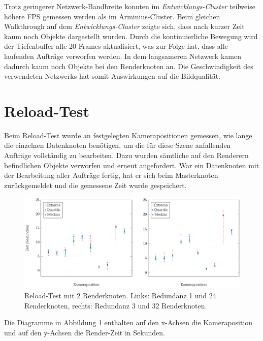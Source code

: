 Trotz geringerer Netzwerk-Bandbreite konnten im \textit{Entwicklungs-Cluster} teilweise höhere FPS gemessen werden als im Arminius-Cluster. Beim gleichen Walkthrough auf dem \textit{Entwicklungs-Cluster} zeigte sich, dass nach kurzer Zeit kaum noch Objekte dargestellt wurden. Durch die kontinuierliche Bewegung wird der Tiefenbuffer alle 20 Frames aktualisiert, was zur Folge hat, dass alle laufenden Aufträge verworfen werden. In dem langsameren Netzwerk kamen dadurch kaum noch Objekte bei den Renderknoten an. Die Geschwindigkeit des verwendeten Netzwerks hat somit Auswirkungen auf die Bildqualität.

\section{Reload-Test}
\label{sec:eval:reload}
Beim Reload-Test wurde an festgelegten Kamerapositionen gemessen, wie lange die einzelnen Datenknoten benötigen, um die für diese Szene anfallenden Aufträge vollständig zu bearbeiten. Dazu wurden sämtliche auf den Renderern befindlichen Objekte verworfen und erneut angefordert. War ein Datenknoten mit der Bearbeitung aller Aufträge fertig, hat er sich beim Masterknoten zurückgemeldet und die gemessene Zeit wurde gespeichert.
\begin{figure}
\centering
\includegraphics[width=\hsize]{images/diag_reload.pdf}
  \caption{\label{fig:eval:reload}Reload-Test mit 2 Renderknoten. Links: Redundanz 1 und 24 Renderknoten, rechts: Redundanz 3 und 32 Renderknoten.}
\end{figure}
Die Diagramme in Abbildung \ref{fig:eval:reload} enthalten auf den x-Achsen die Kameraposition und auf den y-Achsen die Render-Zeit in Sekunden. 

